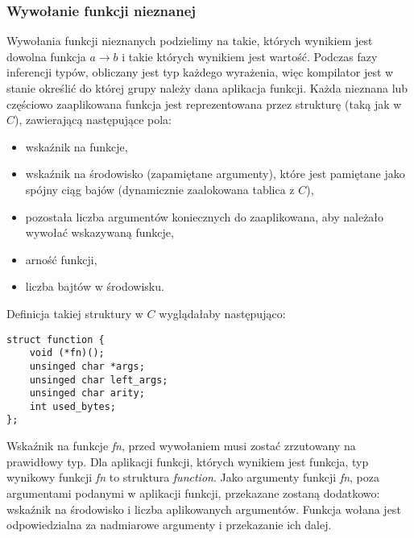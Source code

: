 \documentclass[declaration,shortabstract]{iithesis}
\begin{document}
\subsubsection{Wywołanie funkcji nieznanej}

Wywołania funkcji nieznanych podzielimy na takie, których wynikiem jest dowolna
funkcja $ a \rightarrow b $ i takie których wynikiem jest wartość. Podczas
fazy inferencji typów, obliczany jest typ każdego wyrażenia, więc kompilator
jest w stanie określić do której grupy należy dana aplikacja funkcji. Każda 
nieznana lub częściowo zaaplikowana funkcja jest reprezentowana przez strukturę 
(taką jak w $C$), 
zawierającą następujące pola:

\begin{itemize}
  \item wskaźnik na funkcje,
  \item wskaźnik na środowisko (zapamiętane argumenty), które jest pamiętane 
  jako spójny ciąg bajów (dynamicznie zaalokowana tablica z $C$),
  \item pozostała liczba argumentów koniecznych do zaaplikowana, aby należało 
  wywołać wskazywaną funkcje,
  \item arność funkcji,
  \item liczba bajtów w środowisku.
\end{itemize}

Definicja takiej struktury w $C$ wyglądałaby następująco:

\begin{lstlisting}[frame=single, caption=Rozwinięta funkcja w OCamlu.]
struct function {
    void (*fn)();
    unsinged char *args;
    unsinged char left_args;
    unsinged char arity;
    int used_bytes;   
};
\end{lstlisting}

Wskaźnik na funkcje \textit{fn}, przed wywołaniem musi zostać zrzutowany na 
prawidłowy typ. Dla aplikacji funkcji, których wynikiem jest funkcja, typ 
wynikowy funkcji \textit{fn} to struktura \textit{function}. Jako argumenty 
funkcji \textit{fn}, poza argumentami podanymi w aplikacji funkcji, przekazane 
zostaną dodatkowo: wskaźnik na środowisko i liczba aplikowanych argumentów.
Funkcja wołana jest odpowiedzialna za nadmiarowe argumenty i przekazanie ich 
dalej.
\end{document}
